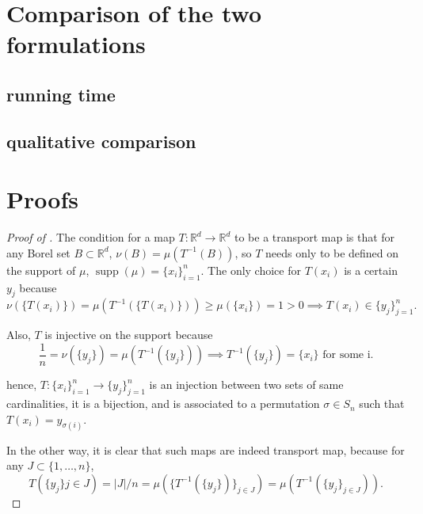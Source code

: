 \documentclass[a4paper]{article}
\theoremstyle{definition}
\theoremstyle{remark}
\DeclareMathOperator*{\supp}{supp}
\newcommand{\R}{\mathbb{R}}
\begin{document}
\section{Comparison of the two formulations}
\subsection{running time}
\subsection{qualitative comparison}
\section{Proofs} \label{sec:proofs}
\begin{proof}[Proof of ] \label{proof:permutation_map}
    The condition for a map $T:\R^d\to\R^d$ to be a transport map is that for any Borel set $B\subset \R^d$, $\nu(B) = \mu(T^{-1}(B))$, so $T$ needs only to be defined on the support of $\mu$, $\supp(\mu)=\{x_i\}_{i=1}^n$. The only choice for $T(x_i)$ is a certain $y_j$ because 
    $$\nu(\{T(x_i)\}) = \mu(T^{-1}(\{T(x_i)\})) \geq \mu(\{x_i\}) = 1 > 0 
    \implies T(x_i)\in\{y_j\}_{j=1}^n.$$
    
    Also, $T$ is injective on the support because 
    $$\frac{1}{n} = \nu(\{y_j\}) = \mu(T^{-1}(\{y_j\})) 
    \implies T^{-1}(\{y_j\}) = \{x_i\} \text{ for some i.}$$ 
    
    hence, $T:\{x_i\}_{i=1}^n \to \{y_j\}_{j=1}^n$  is an injection between two sets of same cardinalities, it is a bijection, and is associated to a permutation $\sigma\in S_n$ such that $T(x_i) = y_{\sigma(i)}$.
    
    In the other way, it is clear that such maps are indeed transport map, because for any $J\subset\{1,\dots,n\}$, 
    $$T(\{y_j\}{j\in J}) = |J|/n = \mu(\{T^{-1}(\{y_j\})\}_{j\in J}) = \mu(T^{-1}(\{y_j\}_{j\in J})).$$
\end{proof}
\end{document}
